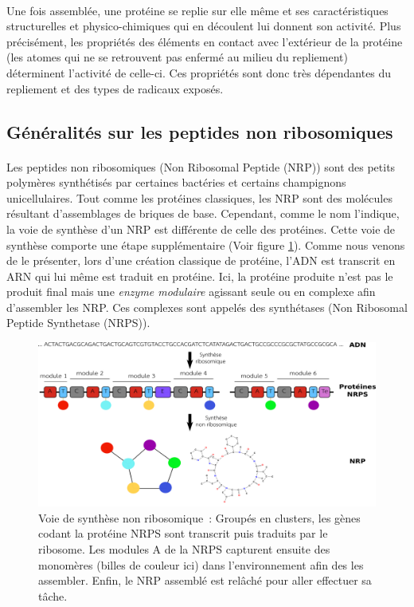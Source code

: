\documentclass[12pt,french,twoside]{report}
\begin{document}
\paragraph{}Une fois assemblée, une protéine se replie sur elle même et ses caractéristiques structurelles et physico-chimiques qui en découlent lui donnent son activité.
Plus précisément, les propriétés des éléments en contact avec l'extérieur de la protéine (les atomes qui ne se retrouvent pas enfermé au milieu du repliement) déterminent l'activité de celle-ci.
Ces propriétés sont donc très dépendantes du repliement et des types de radicaux exposés.



\subsection{Généralités sur les peptides non ribosomiques}
\paragraph{}Les peptides non ribosomiques (Non Ribosomal Peptide (NRP)) sont des petits polymères synthétisés par certaines bactéries et certains champignons unicellulaires.
Tout comme les protéines classiques, les NRP sont des molécules résultant d'assemblages de briques de base.
Cependant, comme le nom l'indique, la voie de synthèse d'un NRP est différente de celle des protéines.
Cette voie de synthèse comporte une étape supplémentaire (Voir figure \ref{global}).
Comme nous venons de le présenter, lors d'une création classique de protéine, l'ADN est transcrit en ARN qui lui même est traduit en protéine.
Ici, la protéine produite n'est pas le produit final mais une \textit{enzyme modulaire} agissant seule ou en complexe afin d'assembler les NRP.
Ces complexes sont appelés des synthétases (Non Ribosomal Peptide Synthetase (NRPS)).

\begin{figure}[h!]
  \begin{center}
    \includegraphics[width=450px]{Figures/bio/Intro/synthese.png}
    \caption{\label{global}Voie de synthèse non ribosomique~:
    Groupés en clusters, les gènes codant la protéine NRPS sont transcrit puis traduits par le ribosome.
    Les modules A de la NRPS capturent ensuite des monomères (billes de couleur ici) dans l'environnement afin des les assembler.
    Enfin, le NRP assemblé est relâché pour aller effectuer sa tâche.
    }
  \end{center}
\end{figure}
\end{document}
